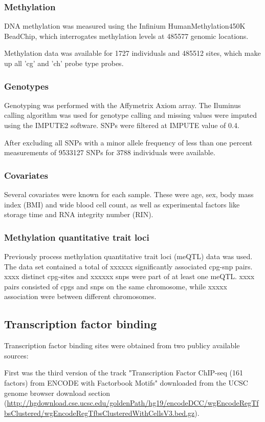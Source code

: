 \documentclass[a4paper,12pt]{article}
\begin{document}
\subsubsection{Methylation}
DNA methylation was measured using the Infinium HumanMethylation450K BeadChip, which interrogates methylation levels at 485577 genomic locations.  

Methylation data was available for 1727 individuals and 485512 sites, which make up all 'cg' and 'ch' probe type probes.
 
\subsubsection{Genotypes}
Genotyping was performed with the Affymetrix Axiom array. The Iluminus calling algorithm was used for genotype calling and missing values were imputed using the IMPUTE2 software\cite{10.1371/journal.pgen.1000529}. SNPs were filtered at IMPUTE value of 0.4. 

After excluding all SNPs with a minor allele frequency of less than one percent measurements of 9533127 SNPs for 3788 individuals were available. 

\subsubsection{Covariates}
Several covariates were known for each sample. These were age, sex, body mass index (BMI) and wide blood cell count, as well as experimental factors like storage time and RNA integrity number (RIN).

\subsubsection{Methylation quantitative trait loci}
Previously process methylation quantitative trait loci (meQTL) data was used. The data set contained a total of xxxxxx significantly associated cpg-snp pairs. 
xxxx distinct cpg-sites and xxxxxx snps were part of at least one meQTL. xxxx pairs consisted of cpgs and snps on the same chromosome, while xxxxx association were between different chromosomes. 

\subsection{Transcription factor binding}
Transcription factor binding sites were obtained from two publicy available sources: 

First was the third version of the track "Transcription Factor ChIP-seq (161 factors) from ENCODE with Factorbook Motifs"\cite{10.1101/gr.139105.112} downloaded from the UCSC genome browser download section (\url{http://hgdownload.cse.ucsc.edu/goldenPath/hg19/encodeDCC/wgEncodeRegTfbsClustered/wgEncodeRegTfbsClusteredWithCellsV3.bed.gz}).
\end{document}
